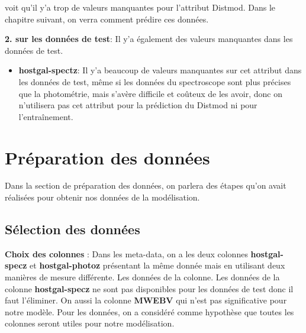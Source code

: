 \begin{itemize}
    \itemOn voit qu'il y'a trop de valeurs manquantes pour l'attribut Distmod. Dans le chapitre suivant, on verra comment prédire ces données.
\end{itemize}
\newline

\textbf{2. sur les données de test}: Il y'a également des valeurs manquantes dans les données de test.
\newline
\begin{itemize}
    \item \textbf{hostgal-spectz}: Il y'a beaucoup de valeurs manquantes sur cet attribut dans les données de test, même si les données du spectroscope sont plus précises que la photométrie, mais s'avère difficile et coûteux de les avoir, donc on n'utilisera pas cet attribut pour la prédiction du Distmod ni pour l'entraînement.  
\end{itemize}




\section{Préparation des données}\label{sec:data_preparation}
Dans la section de préparation des données, on parlera des étapes qu’on avait réalisées pour obtenir nos données de la modélisation.
\subsection{Sélection des données}
\textbf{Choix des colonnes} : Dans les meta-data, on a les deux colonnes \textbf{hostgal-specz} et\textbf{ hostgal-photoz} présentant la même donnée mais en utilisant deux manières de mesure différente. Les données de la colonne. Les données de la colonne \textbf{hostgal-specz} ne sont pas disponibles pour les données de test donc il faut l’éliminer. On aussi la colonne \textbf{MWEBV} qui n’est pas significative pour notre modèle. Pour les données, on a considéré comme hypothèse que toutes les colonnes seront utiles pour notre modélisation.
